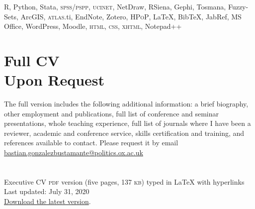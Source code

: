 \documentclass[letterpaper,margin]{res}
\begin{document}
\begin{resume}
{\small R, Python, Stata, {\scshape spss/pspp}, {\scshape ucinet}, NetDraw, RSiena, Gephi, Tosmana, Fuzzy-Sets, ArcGIS, {\scshape atlas}.ti, EndNote, Zotero, {\scshape HPoP}, {\LaTeX}, Bib{\TeX}, JabRef, MS Office, WordPress, Moodle, {\scshape html}, {\scshape css}, {\scshape xhtml}, Notepad{\footnotesize ++}}


\section{\footnotesize Full CV \\ Upon Request}

{\small The full version includes the following additional information: a brief biography, other employment and publications, full list of conference and seminar presentations, whole teaching experience, full list of journals where I have been a reviewer, academic and conference service, skills certification and training, and references available to contact. Please request it by email {\large \Letter} \href{mailto:bastian.gonzalezbustamante@politics.ox.ac.uk}{bastian.gonzalezbustamante@politics.ox.ac.uk}}\\

\section{}
{\footnotesize Executive CV {\scshape pdf} version (five pages, 137 {\scshape kb}) typed in {\small {\LaTeX}} with hyperlinks}\\
{\footnotesize Last updated: July 31, 2020}\\
{\footnotesize {\normalsize \faGithub} \href{https://bgonzalezbustamante.github.io/CV-LaTeX/}{Download the latest version}.}

\end{resume} 
\end{document}
